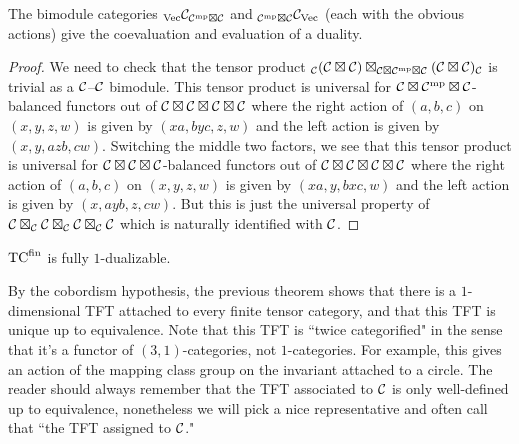 \documentclass{amsart}
\begin{document}
\begin{theorem} \label{thm:objduals}
The bimodule categories ${}_\mathrm{\mathrm{Vec}} \mathcal C_{\mathcal C^{\mathrm{mp}} \boxtimes \mathcal C}$ and ${}_{\mathcal C^{\mathrm{mp}} \boxtimes \mathcal C} \mathcal C_{\mathrm{Vec}}$ (each with the obvious actions) give the coevaluation and evaluation of a duality.
\end{theorem}
\begin{proof}
We need to check that the tensor product ${}_\mathcal C (\mathcal C \boxtimes \mathcal C) \boxtimes_{\mathcal C \boxtimes \mathcal C^{\mathrm{mp}} \boxtimes \mathcal C} (\mathcal C \boxtimes \mathcal C)_\mathcal C$ is trivial as a $\mathcal C$--$\mathcal C$ bimodule.  This tensor product is universal for $\mathcal C \boxtimes \mathcal C^{\mathrm{mp}} \boxtimes \mathcal C$-balanced functors out of $\mathcal C \boxtimes \mathcal C \boxtimes \mathcal C \boxtimes \mathcal C$ where the right action of $(a,b,c)$ on $(x,y,z,w)$ is given by $(xa,byc,z,w)$ and the left action is given by $(x,y,azb,cw)$.  Switching the middle two factors, we see that this tensor product is universal for $\mathcal C \boxtimes \mathcal C \boxtimes \mathcal C$-balanced functors out of $\mathcal C \boxtimes \mathcal C \boxtimes \mathcal C \boxtimes \mathcal C$ where the right action of $(a,b,c)$ on $(x,y,z,w)$ is given by $(xa,y, bxc, w)$ and the left action is given by $(x, ayb, z,cw)$.  But this is just the universal property of $\mathcal C \boxtimes_\mathcal C \mathcal C \boxtimes_\mathcal C \mathcal C \boxtimes_\mathcal C \mathcal C$ which is naturally identified with $\mathcal C$.
\end{proof}

\begin{proposition}
	${\mathrm{TC}^{\text{fin}}}$ is fully $1$-dualizable. 
\end{proposition}


By the cobordism hypothesis, the previous theorem shows that there is a $1$-dimensional TFT attached to every finite tensor category, and that this TFT is unique up to equivalence.  Note that this TFT is ``twice categorified" in the sense that it's a functor of $(3,1)$-categories, not $1$-categories.  For example, this gives an action of the mapping class group on the invariant attached to a circle.  The reader should always remember that the TFT associated to $\mathcal C$ is only well-defined up to equivalence, nonetheless we will pick a nice representative and often call that ``the TFT assigned to $\mathcal C$."
\end{document}
